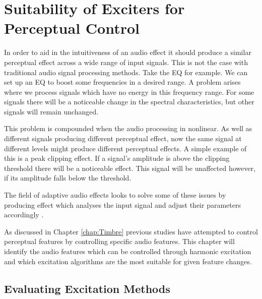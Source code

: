 
\chapter{Suitability of Exciters for Perceptual Control}
\label{chap:FeatureControl}

	In order to aid in the intuitiveness of an audio effect it should produce a similar perceptual effect across a wide range of input signals. This is not the case with traditional audio signal processing methods. Take the EQ for example. We can set up an EQ to boost some frequencies in a desired range. A problem arises where we process signals which have no energy in this frequency range. For some signals there will be a noticeable change in the spectral characteristics, but other signals will remain unchanged.

	This problem is compounded when the audio processing in nonlinear. As well as different signals producing different perceptual effect, now the same signal at different levels might produce different perceptual effects. A simple example of this is a peak clipping effect. If a signal's amplitude is above the clipping threshold there will be a noticeable effect. This signal will be unaffected however, if its amplitude falls below the threshold.

	The field of adaptive audio effects looks to solve some of these issues by producing effect which analyses the input signal and adjust their parameters accordingly .

	As discussed in Chapter \ref{chap:Timbre} previous studies have attempted to control perceptual features by controlling specific audio features. This chapter will identify the audio features which can be controlled through harmonic excitation and which excitation algorithms are the most suitable for given feature changes.

\section{Evaluating Excitation Methods}
\label{sec:FeatureControl-MethodEvaluation}

